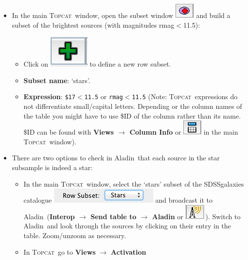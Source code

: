 \documentclass [a4paper, 12pt]{article}
\newcommand{\aladin}{{\textsc{A}{ladin}}}
\newcommand{\topcat}{{\textsc{Topcat}}}
\begin{document}
\begin{itemize}
\item In the main \topcat\ window, open the subset window  
\includegraphics[width=0.04  \textwidth]{../images/topcat_button_subset.jpg} 
and build 
a subset of the brightest sources (with magnitudes rmag$<$11.5):
\begin{itemize}
    \item Click on  \includegraphics[width=0.04  
    \textwidth]{../images/topcat_button_add.jpg}  to define a new row subset.
    \item \textbf{Subset name}: `stars'.
    \item \textbf{Expression}: \texttt{\$17$<$11.5} or \texttt{rmag$<$11.5} 
    (Note: \topcat\ expressions 
    do not differentiate small/capital letters. Depending or the column names 
    of the table you might have to use \$ID of the column rather than its name. 
    \$ID can be found with \textbf{Views $\rightarrow$ Column Info} or 
    \includegraphics[width=0.04 
    \textwidth]{../images/topcat_button_metadata.jpg} in 
    the main \topcat\ window).
\end{itemize}
\item There are two options to check in \aladin\ that each source in the star 
subsample is indeed a star:
\begin{itemize}
    \item In the main \topcat\ window, select the `stars' subset of the 
    SDSSgalaxies catalogue  \includegraphics[width=0.2  
    \textwidth]{../images/topcat_dropdown-menu_subsets.jpg} and broadcast it to 
    \aladin\ 
    (\textbf{Interop $\rightarrow$ Send table to $\rightarrow$ Aladin} or  
    \includegraphics[width=0.04  
    \textwidth]{../images/topcat_button_broadcast.jpg}). Switch to 
    \aladin\ and look through the sources by clicking on their entry in the 
    table. Zoom/unzoom as necessary. 
    \item In \topcat\ go to \textbf{Views} $\rightarrow$ \textbf{Activation 
}
\end{itemize}
\end{itemize}
\end{document}
